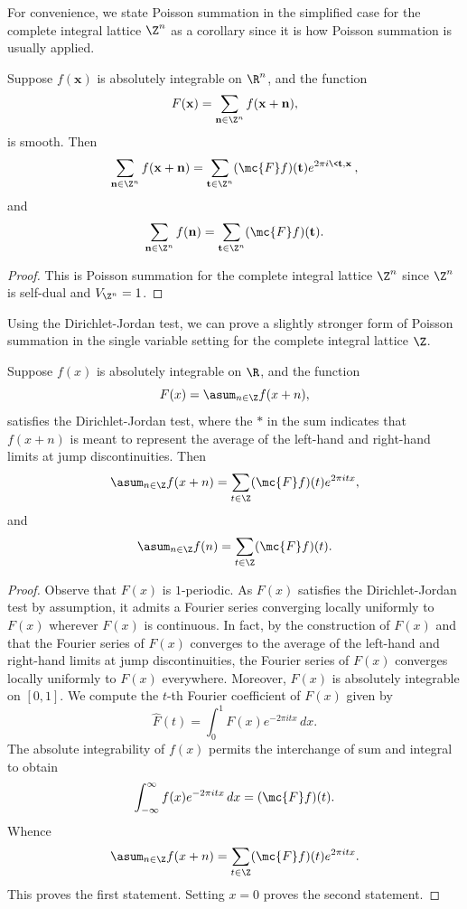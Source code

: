 \documentclass[12pt]{article}
\begin{document}
    For convenience, we state Poisson summation in the simplified case for the complete integral lattice \(\Z^{n}\) as a corollary since it is how Poisson summation is usually applied.

    \begin{corollary}
      Suppose \(f(\mathbf{x})\) is absolutely integrable on \(\R^{n}\), and the function
      \[
        F(\mathbf{x}) = \sum_{\mathbf{n} \in \Z^{n}}f(\mathbf{x}+\mathbf{n}),
      \]
      is smooth. Then
      \[
        \sum_{\mathbf{n} \in \Z^{n}}f(\mathbf{x}+\mathbf{n}) = \sum_{\mathbf{t} \in \Z^{n}}(\mc{F}f)(\mathbf{t})e^{2\pi i\<\mathbf{t},\mathbf{x}\>},
      \]
      and
      \[
        \sum_{\mathbf{n} \in \Z^{n}}f(\mathbf{n}) = \sum_{\mathbf{t} \in \Z^{n}}(\mc{F}f)(\mathbf{t}).
      \]
    \end{corollary}
    \begin{proof}
      This is Poisson summation for the complete integral lattice \(\Z^{n}\) since \(\Z^{n}\) is self-dual and \(V_{\Z^{n}} = 1\).
    \end{proof}

    Using the Dirichlet-Jordan test, we can prove a slightly stronger form of Poisson summation in the single variable setting for the complete integral lattice \(\Z\).

    \begin{theorem}
      Suppose \(f(x)\) is absolutely integrable on \(\R\), and the function
      \[
        F(x) = \asum_{n \in \Z}f(x+n),
      \]
      satisfies the Dirichlet-Jordan test, where the \(\ast\) in the sum indicates that \(f(x+n)\) is meant to represent the average of the left-hand and right-hand limits at jump discontinuities. Then
      \[
        \asum_{n \in \Z}f(x+n) = \sum_{t \in \Z}(\mc{F}f)(t)e^{2\pi itx},
      \]
      and
      \[
        \asum_{n \in \Z}f(n) = \sum_{t \in \Z}(\mc{F}f)(t).
      \]
    \end{theorem}
    \begin{proof}
      Observe that \(F(x)\) is \(1\)-periodic. As \(F(x)\) satisfies the Dirichlet-Jordan test by assumption, it admits a Fourier series converging locally uniformly to \(F(x)\) wherever \(F(x)\) is continuous. In fact, by the construction of \(F(x)\) and that the Fourier series of \(F(x)\) converges to the average of the left-hand and right-hand limits at jump discontinuities, the Fourier series of \(F(x)\) converges locally uniformly to \(F(x)\) everywhere. Moreover, \(F(x)\) is absolutely integrable on \([0,1]\). We compute the \(t\)-th Fourier coefficient of \(F(x)\) given by
      \[
        \hat{F}(t) = \int_{0}^{1}F(x)e^{-2\pi itx}\,dx.
      \]
      The absolute integrability of \(f(x)\) permits the interchange of sum and integral to obtain
      \[
        \int_{-\infty}^{\infty}f(x)e^{-2\pi itx}\,dx = (\mc{F}f)(t).
      \]
      Whence
      \[
        \asum_{n \in \Z}f(x+n) = \sum_{t \in \Z}(\mc{F}f)(t)e^{2\pi itx}.
      \]
      This proves the first statement. Setting \(x = 0\) proves the second statement.
    \end{proof}
\end{document}
